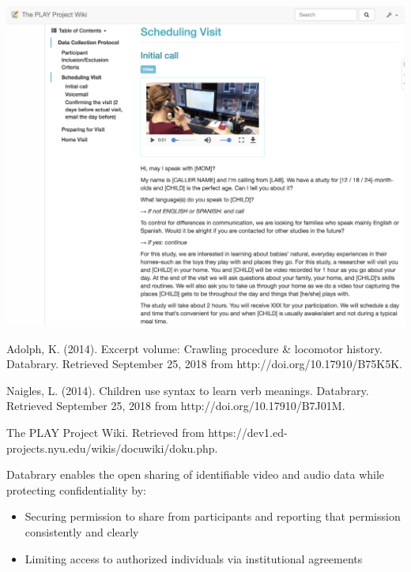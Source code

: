 \documentclass[landscape,final,paperwidth=75in,paperheight=48in,fontscale=0.285]{baposter}
\begin{document}
\begin{poster}
{\begin{center}
    \hfill
    \includegraphics[scale=0.32,valign=t]{img/PLAY-Wiki.png}
\end{center}

\begin{multicols}{3} 
    \tiny
    \par Adolph, K. (2014). Excerpt volume: Crawling procedure \& locomotor history. Databrary. Retrieved September 25, 2018 from http://doi.org/10.17910/B75K5K.
    \columnbreak
    \par Naigles, L. (2014). Children use syntax to learn verb meanings. Databrary. Retrieved September 25, 2018 from http://doi.org/10.17910/B7J01M.
    \columnbreak
    \par The PLAY Project Wiki. Retrieved from https://dev1.ed-projects.nyu.edu/wikis/docuwiki/doku.php.
\end{multicols}
}
{
Databrary enables the open sharing of identifiable video and audio data while protecting confidentiality by:
\begin{itemize}
    \item Securing permission to share from participants and reporting that permission consistently and clearly
    \vspace{-.5em}
    \item Limiting access to authorized individuals via institutional agreements
\end{itemize}    

}
\end{poster}
\end{document}

